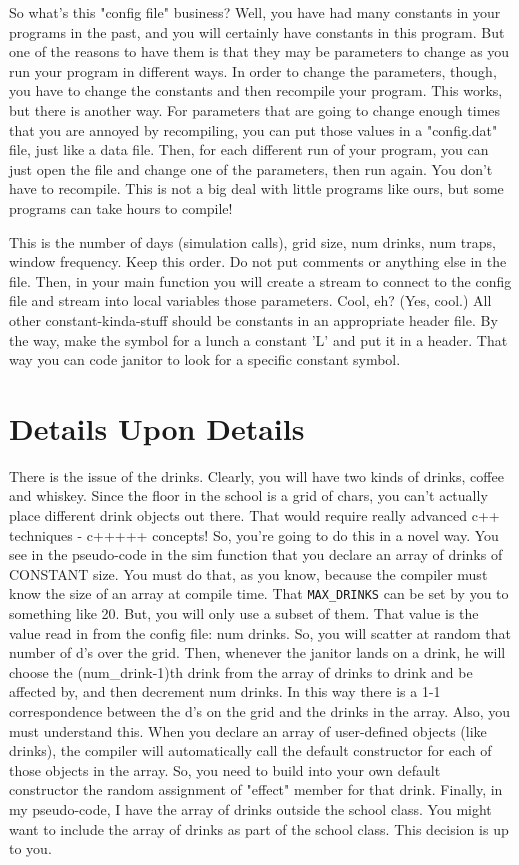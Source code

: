 \documentclass[
    subject = {{Comp Sci}},
    course = {{1570}},
    section = {{101}},
    assignment = {{Assignment 10 \\ Final Project}},
    name = {{Student One ; Student Two}},
    email = {{stosid@mst.edu ; sttsid@mst.edu}}
]{eey-homework}
\begin{document}
So what's this "config file" business? Well, you have had many constants in your programs in the past, and you will certainly have constants in this program.
But one of the reasons to have them is that they may be parameters to change as you run your program in different ways.
In order to change the parameters, though, you have to change the constants and then recompile your program.
This works, but there is another way.
For parameters that are going to change enough times that you are annoyed by recompiling, you can put those values in a "config.dat" file, just like a data file.
Then, for each different run of your program, you can just open the file and change one of the parameters, then run again.
You don't have to recompile.
This is not a big deal with little programs like ours, but some programs can take hours to compile!\hfill\break

This is the number of days (simulation calls), grid size, num drinks, num traps, window frequency.
Keep this order.
Do not put comments or anything else in the file.
Then, in your main function you will create a stream to connect to the config file and stream into local variables those parameters.
Cool, eh? (Yes, cool.)
All other constant-kinda-stuff should be constants in an appropriate header file. By the way, make the symbol for a lunch a constant 'L' and put it in a header.
That way you can code janitor to look for a specific constant symbol.

\section{Details Upon Details}
There is the issue of the drinks.
Clearly, you will have two kinds of drinks, coffee and whiskey.
Since the floor in the school is a grid of chars, you can't actually place different drink objects out there.
That would require really advanced c++ techniques - c+++++ concepts! So, you're going to do this in a novel way.
You see in the pseudo-code in the sim function that you declare an array of drinks of CONSTANT size.
You must do that, as you know, because the compiler must know the size of an array at compile time.
That \verb|MAX_DRINKS| can be set by you to something like 20.
But, you will only use a subset of them.
That value is the value read in from the config file: num drinks.
So, you will scatter at random that number of d's over the grid.
Then, whenever the janitor lands on a drink, he will choose the (num\_drink-1)th drink from the array of drinks to drink and be affected by, and then decrement num drinks.
In this way there is a 1-1 correspondence between the d's on the grid and the drinks in the array.
Also, you must understand this.
When you declare an array of user-defined objects (like drinks), the compiler will automatically call the default constructor for each of those objects in the array.
So, you need to build into your own default constructor the random assignment of "effect" member for that drink.
Finally, in my pseudo-code, I have the array of drinks outside the school class.
You might want to include the array of drinks as part of the school class.
This decision is up to you.\hfill\break
\end{document}
